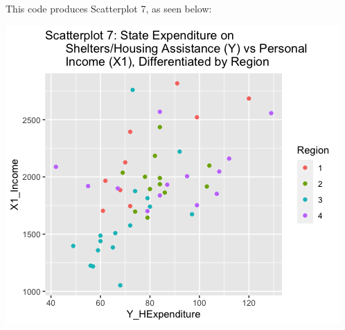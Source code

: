 \documentclass[12pt,letterpaper]{article}
\begin{document}
\begin{itemize}
		This code produces Scatterplot 7, as seen below:
		\begin{center}	
		\includegraphics[scale=.80]{Scatterplot7.png}
		\end{center}
		
		
	\end{itemize}
	
	
\end{document}
